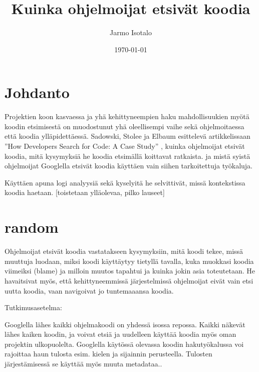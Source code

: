 \documentclass[finnish]{../tktltiki2}
\title{Kuinka ohjelmoijat etsivät koodia}
\author{Jarmo Isotalo}
\date{\today}
\theoremstyle{definition}
\theoremstyle{remark}
\begin{document}

\frontmatter      %

\maketitle        %

\tableofcontents  %


\mainmatter       %

\section{Johdanto}

Projektien koon kasvaessa ja yhä kehittyneempien haku mahdollisuukien myötä koodin etsimisestä on muodostunut yhä oleellisempi vaihe sekä ohjelmoitaessa että koodia ylläpidettäessä. Sadowski, Stolee ja Elbaum esittelevä artikkelissaan ''How Developers Search for Code: A Case Study'' \cite{g_search_code} , kuinka ohjelmoijat etsivät koodia, mitä kysymyksiä he koodia etsimällä koittavat ratkaista. ja mistä syistä ohjelmoijat Googlella etsivät koodia käyttäen vain siihen tarkoitettuja työkaluja.

Käyttäen apuna logi analyysiä sekä kyselyitä he selvittivät, missä kontekstissa koodia haetaan. [toistetaan ylläolevaa, pilko lauseet]

\section{random}

Ohjelmoijat etsivät koodia vastatakseen kysymyksiin, mitä koodi tekee, missä muuttuja luodaan, miksi koodi käyttäytyy tietyllä tavalla, kuka muokkasi koodia viimeiksi (blame) ja milloin muutos tapahtui ja kuinka jokin asia toteutetaan.
He havaitsivat myös, ettâ kehittyneemmissä järjestelmissä ohjelmoijat eivät vain etsi uutta koodia, vaan navigoivat jo tuntemaaansa koodia.

Tutkimusasetelma:

Googlella lähes kaikki ohjelmakoodi on yhdessä isossa repossa. Kaikki näkevät lähes kaiken koodin, ja voivat etsiä ja uudelleen käyttää koodia myös oman projektin ulkopuolelta. Googlella käytössä olevassa koodin hakutyökalussa voi rajoittaa haun tulosta esim. kielen ja sijainnin perusteella. Tulosten järjestämisessä se käyttää myös muuta metadataa..
\end{document}
